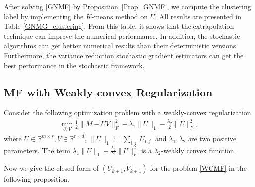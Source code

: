 \documentclass[letterpaper]{article} %
\begin{document}
	After solving \eqref{GNMF} by Proposition~\ref{Prop_GNMF}, we compute the clustering label by implementing the $K$-means method \cite{litekmeans} on $U$.
	All results are presented in Table \ref{GNMG_clustering}.
	From this table, it shows that the extrapolation technique can improve the numerical performance. In addition, the stochastic algorithms can get better numerical results than their deterministic versions. Furthermore, the variance reduction stochastic gradient estimators can get the best performance in the stochastic framework.

	\subsection{MF with Weakly-convex Regularization}\label{Sparse_NMF}

	Consider the following  optimization problem with a weakly-convex regularization \cite{YinLHX15, MaLH17}
	\begin{eqnarray}
		\min_{U,V}\frac{1}{2}\|M-UV\|_{F}^{2}+\lambda_{1}\|U\|_{1}-\frac{\lambda_{2}}{2}\|U\|_{F}^{2},\label{WCMF}
	\end{eqnarray}
	where $U\in\mathbb{R}^{m\times r},V\in\mathbb{R}^{r\times d}$, $\|U\|_{1}:=\sum_{i,j}|U_{i,j}|$ and $\lambda_{1},\lambda_{2}$ are two positive parameters. The term $\lambda_{1}\|U\|_{1}-\frac{\lambda_{2}}{2}\|U\|_{F}^{2}$ is a $\lambda_{2}$-weakly convex function.

	Now we give the closed-form of $(U_{k+1}, V_{k+1})$ for the problem \eqref{WCMF}  in the following proposition.
\end{document}
